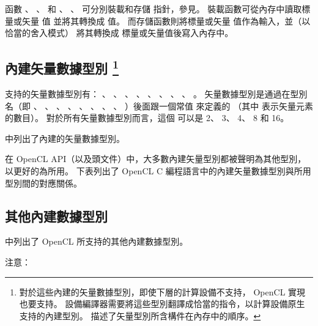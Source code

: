 函數 、 、 
 和 、 、 
 可分別裝載和存儲  指針，參見。
裝載函數可從內存中讀取標量或矢量  值 並將其轉換成  值。
而存儲函數則將標量或矢量  值作為輸入，並（以恰當的舍入模式）
將其轉換成  標量或矢量值後寫入內存中。


\subsection[sec:bivdt]{內建矢量數據型別
\footnote{對於這些內建的矢量數據型別，即使下層的計算設備不支持， OpenCL 實現也要支持。
設備編譯器需要將這些型別翻譯成恰當的指令，以計算設備原生支持的內建型別。
 描述了矢量型別所含構件在內存中的順序。}}

支持的矢量數據型別有： 、 、 、
 、 、 、
 、 、 。
矢量數據型別是通過在型別名（即 、 、 、
 、 、 、 、 、
 ）後面跟一個常值  來定義的
（其中  表示矢量元素的數目）。
對於所有矢量數據型別而言，這個  可以是 2、 3、 4、 8 和 16。

中列出了內建的矢量數據型別。

{}

在 OpenCL API（以及頭文件）中，大多數內建矢量型別都被聲明為其他型別，
以更好的為所用。
下表列出了 OpenCL C 編程語言中的內建矢量數據型別與所用型別間的對應關係。



\subsection[sec:obidt]{其他內建數據型別}

中列出了 OpenCL 所支持的其他內建數據型別。

{}

注意：


